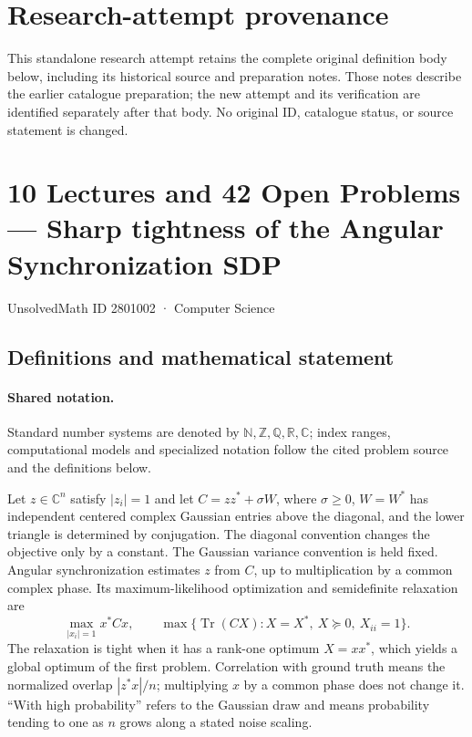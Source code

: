 \documentclass[11pt]{article}
\begin{document}
\section*{Research-attempt provenance}
This standalone research attempt retains the complete original definition body below,
including its historical source and preparation notes. Those notes describe the
earlier catalogue preparation; the new attempt and its verification are identified
separately after that body. No original ID, catalogue status, or source statement is changed.

\section{10 Lectures and 42 Open Problems — Sharp tightness of the Angular Synchronization SDP}\label{2801002}
{\small UnsolvedMath ID 2801002 · Computer Science}
\subsection{Definitions and mathematical statement}

\paragraph{Shared notation.}Standard number systems are denoted by $\mathbb N,\mathbb Z,\mathbb Q,\mathbb R,\mathbb C$; index ranges, computational models and specialized notation follow the cited problem source and the definitions below.


Let $z\in\mathbb{C}^n$ satisfy $|z_i|=1$ and let $C=zz^*+\sigma W$, where $\sigma\ge0$, $W=W^*$ has independent centered complex Gaussian entries above the diagonal, and the lower triangle is determined by conjugation. The diagonal convention changes the objective only by a constant. The Gaussian variance convention is held fixed. Angular synchronization estimates $z$ from $C$, up to multiplication by a common complex phase. Its maximum-likelihood optimization and semidefinite relaxation are
\[
 \max_{|x_i|=1} x^*Cx,\qquad
 \max\{\operatorname{Tr}(CX):X=X^*,\ X\succeq0,\ X_{ii}=1\}.
\]
The relaxation is tight when it has a rank-one optimum $X=xx^*$, which yields a global optimum of the first problem. Correlation with ground truth means the normalized overlap $|z^*x|/n$; multiplying $x$ by a common phase does not change it. ``With high probability'' refers to the Gaussian draw and means probability tending to one as $n$ grows along a stated noise scaling.
\end{document}
